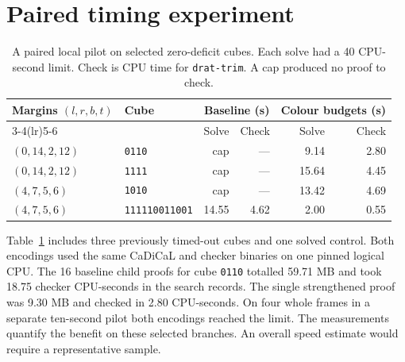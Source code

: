 \documentclass[11pt]{article}
\begin{document}
\section{Paired timing experiment}\label{app:pilot}
\begin{table}[htbp]
\centering\small
\begin{tabular}{llrrrr}
\toprule
Margins $(l,r,b,t)$ & Cube & \multicolumn{2}{c}{Baseline (s)}
 & \multicolumn{2}{c}{Colour budgets (s)}\\
\cmidrule(lr){3-4}\cmidrule(lr){5-6}
 & & Solve & Check & Solve & Check\\
\midrule
$(0,14,2,12)$ & \texttt{0110}         & cap   & ---  & 9.14  & 2.80\\
$(0,14,2,12)$ & \texttt{1111}         & cap   & ---  & 15.64 & 4.45\\
$(4,7,5,6)$   & \texttt{1010}         & cap   & ---  & 13.42 & 4.69\\
$(4,7,5,6)$   & \texttt{111110011001} & 14.55 & 4.62 & 2.00  & 0.55\\
\bottomrule
\end{tabular}
\caption{A paired local pilot on selected zero-deficit cubes. Each solve
had a 40 CPU-second limit. Check is CPU time for \texttt{drat-trim}.
A cap produced no proof to check.}\label{tab:pilot}
\end{table}

Table~\ref{tab:pilot} includes three previously timed-out cubes and one
solved control. Both encodings used the same CaDiCaL and checker binaries
on one pinned logical CPU. The 16 baseline child proofs for cube
\texttt{0110} totalled 59.71 MB and took 18.75 checker CPU-seconds in the search records. The
single strengthened proof was 9.30 MB and checked in 2.80 CPU-seconds.
On four whole frames in a separate ten-second pilot both encodings reached
the limit. The measurements quantify the benefit on these selected
branches. An overall speed estimate would require a representative sample.
\end{document}
